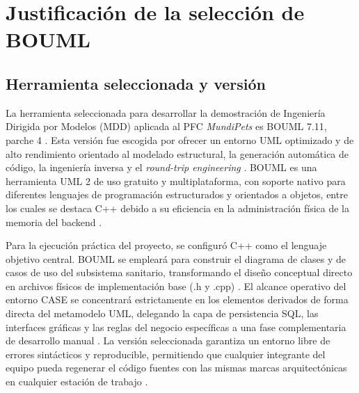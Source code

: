 \documentclass[journal,onecolumn]{IEEEtran}
\begin{document}
	\section{Justificación de la selección de BOUML}
	
	\subsection{Herramienta seleccionada y versión}
	La herramienta seleccionada para desarrollar la demostración de Ingeniería Dirigida por Modelos (MDD) aplicada al PFC \textit{MundiPets} es BOUML 7.11, parche 4 \cite{BOUML2025}. Esta versión fue escogida por ofrecer un entorno UML optimizado y de alto rendimiento orientado al modelado estructural, la generación automática de código, la ingeniería inversa y el \textit{round-trip engineering} \cite{BOUMLFeatures2026}. BOUML es una herramienta UML 2 de uso gratuito y multiplataforma, con soporte nativo para diferentes lenguajes de programación estructurados y orientados a objetos, entre los cuales se destaca C++ debido a su eficiencia en la administración física de la memoria del backend \cite{BOUML2025, BOUMLFeatures2026}.
	
	Para la ejecución práctica del proyecto, se configuró C++ como el lenguaje objetivo central. BOUML se empleará para construir el diagrama de clases y de casos de uso del subsistema sanitario, transformando el diseño conceptual directo en archivos físicos de implementación base (.h y .cpp) \cite{BOUMLFeatures2026}. El alcance operativo del entorno CASE se concentrará estrictamente en los elementos derivados de forma directa del metamodelo UML, delegando la capa de persistencia SQL, las interfaces gráficas y las reglas del negocio específicas a una fase complementaria de desarrollo manual \cite{ERSMundiPets2026}. La versión seleccionada garantiza un entorno libre de errores sintácticos y reproducible, permitiendo que cualquier integrante del equipo pueda regenerar el código fuentes con las mismas marcas arquitectónicas en cualquier estación de trabajo \cite{GuiaMDD2026}.
	
\end{document}
